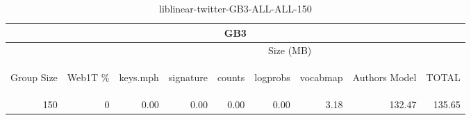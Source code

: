 \begin{center}
\begin{table}[htbp] 
 \begin{center}
\begin{tabular}{ | r | r | r | r | r | r | r | r | r |}
\hline
\multicolumn{9}{|c|}{GB3}\\
\hline
 & & \multicolumn{7}{|c|}{Size (MB)}\\ \cline{3-9}
\begin{sideways}Group Size\end{sideways} & \begin{sideways}Web1T \% \end{sideways} & \begin{sideways}keys.mph\end{sideways} & \begin{sideways}signature\end{sideways} & \begin{sideways}counts\end{sideways} & \begin{sideways}logprobs\end{sideways} & \begin{sideways}vocabmap\end{sideways} & \begin{sideways}Authors Model \end{sideways} & \begin{sideways}TOTAL\end{sideways}\\
\hline
\multirow{0}{*}{150}
 & 0 & 0.00 & 0.00 & 0.00 & 0.00 & 3.18 & 132.47 & 135.65\\ \cline{2-9}
\hline
\end{tabular}
\caption{liblinear-twitter-GB3-ALL-ALL-150}
\label{table:liblinear-twitter-GB3-ALL-ALL-150}
\end{center}
 \end{table}
\end{center}

